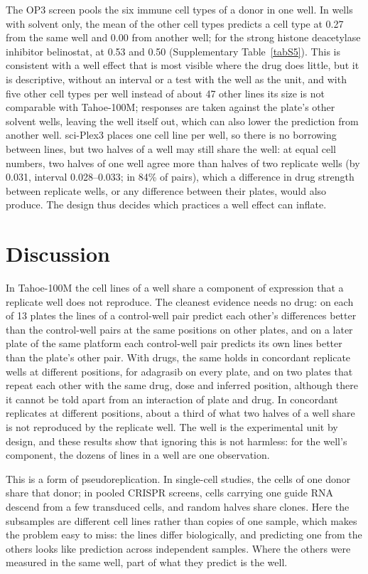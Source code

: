 \documentclass[pdflatex,sn-nature]{sn-jnl}
\begin{document}
The OP3 screen pools the six immune cell types of a donor in one well\cite{szalata2024}. In wells with solvent only, the mean of the other cell types predicts a cell type at 0.27 from the same well and 0.00 from another well; for the strong histone deacetylase inhibitor belinostat, at 0.53 and 0.50 (Supplementary Table~\ref{tabS5}). This is consistent with a well effect that is most visible where the drug does little, but it is descriptive, without an interval or a test with the well as the unit, and with five other cell types per well instead of about 47 other lines its size is not comparable with Tahoe-100M; responses are taken against the plate's other solvent wells, leaving the well itself out, which can also lower the prediction from another well. sci-Plex3 places one cell line per well\cite{srivatsan2020}, so there is no borrowing between lines, but two halves of a well may still share the well: at equal cell numbers, two halves of one well agree more than halves of two replicate wells (by 0.031, interval 0.028--0.033; in 84\% of pairs), which a difference in drug strength between replicate wells, or any difference between their plates, would also produce. The design thus decides which practices a well effect can inflate.

\section{Discussion}

In Tahoe-100M the cell lines of a well share a component of expression that a replicate well does not reproduce. The cleanest evidence needs no drug: on each of 13 plates the lines of a control-well pair predict each other's differences better than the control-well pairs at the same positions on other plates, and on a later plate of the same platform each control-well pair predicts its own lines better than the plate's other pair. With drugs, the same holds in concordant replicate wells at different positions, for adagrasib on every plate, and on two plates that repeat each other with the same drug, dose and inferred position, although there it cannot be told apart from an interaction of plate and drug. In concordant replicates at different positions, about a third of what two halves of a well share is not reproduced by the replicate well. The well is the experimental unit by design, and these results show that ignoring this is not harmless: for the well's component, the dozens of lines in a well are one observation.

This is a form of pseudoreplication. In single-cell studies, the cells of one donor share that donor\cite{zimmerman2021,squair2021}; in pooled CRISPR screens, cells carrying one guide RNA descend from a few transduced cells, and random halves share clones\cite{huang2026clone}. Here the subsamples are different cell lines rather than copies of one sample, which makes the problem easy to miss: the lines differ biologically, and predicting one from the others looks like prediction across independent samples. Where the others were measured in the same well, part of what they predict is the well.
\end{document}
